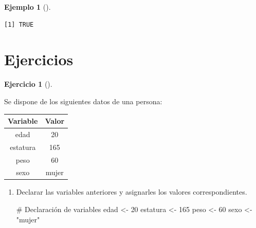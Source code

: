 \documentclass[
  spanish,
  a4paper,
]{scrreport}
\newenvironment{Shaded}{\begin{snugshade}}{\end{snugshade}}
\newcommand{\CommentTok}[1]{\textcolor[rgb]{0.37,0.37,0.37}{#1}}
\newcommand{\DecValTok}[1]{\textcolor[rgb]{0.68,0.00,0.00}{#1}}
\newcommand{\NormalTok}[1]{\textcolor[rgb]{0.00,0.23,0.31}{#1}}
\newcommand{\OtherTok}[1]{\textcolor[rgb]{0.00,0.23,0.31}{#1}}
\newcommand{\StringTok}[1]{\textcolor[rgb]{0.13,0.47,0.30}{#1}}
\newcounter{none} %
\theoremstyle{definition}
\newtheorem{exercise}{Ejercicio}[chapter]
\theoremstyle{definition}
\newtheorem{example}{Ejemplo}[chapter]
\theoremstyle{remark}
\begin{document}
\begin{example}[]
\begin{verbatim}
[1] TRUE
\end{verbatim}

\end{example}

\section{Ejercicios}\label{ejercicios}

\begin{exercise}[]\protect\hypertarget{exr-tipos-datos-1}{}\label{exr-tipos-datos-1}

Se dispone de los siguientes datos de una persona:

{\def\LTcaptype{none} %
\begin{longtable}[]{@{}cc@{}}
\toprule\noalign{}
Variable & Valor \\
\midrule\noalign{}
\endhead
\bottomrule\noalign{}
\endlastfoot
edad & 20 \\
estatura & 165 \\
peso & 60 \\
sexo & mujer \\
\end{longtable}
}

\begin{enumerate}
\def\labelenumi{\alph{enumi}.}
\item
  Declarar las variables anteriores y asignarles los valores
  correspondientes.

  \begin{tcolorbox}[enhanced jigsaw, arc=.35mm, bottomrule=.15mm, bottomtitle=1mm, breakable, colback=white, colbacktitle=quarto-callout-note-color!10!white, colframe=quarto-callout-note-color-frame, coltitle=black, left=2mm, leftrule=.75mm, opacityback=0, opacitybacktitle=0.6, rightrule=.15mm, title=\textcolor{quarto-callout-note-color}{\faInfo}\hspace{0.5em}{Solución}, titlerule=0mm, toprule=.15mm, toptitle=1mm]

\begin{Shaded}
\begin{Highlighting}[]
\CommentTok{\# Declaración de variables}
\NormalTok{edad }\OtherTok{\textless{}{-}} \DecValTok{20}
\NormalTok{estatura }\OtherTok{\textless{}{-}} \DecValTok{165}
\NormalTok{peso }\OtherTok{\textless{}{-}} \DecValTok{60}
\NormalTok{sexo }\OtherTok{\textless{}{-}} \StringTok{"mujer"}
\end{Highlighting}
\end{Shaded}


\end{tcolorbox}
\end{enumerate}
\end{exercise}
\end{document}
